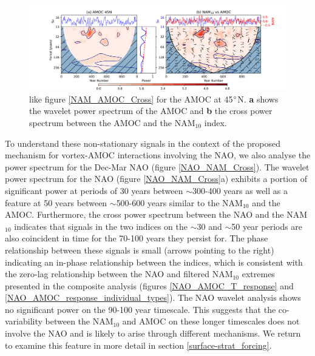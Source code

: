 \begin{center}
\begin{figure}[h!]
\noindent\includegraphics[width = \linewidth]{Figures/Figures-surface/AMOC_NAM_filtered_subplot_45N.png}
\caption[Wavelet power spectrum of the AMOC at 45$\degree$N and cross spectrum with the NAM$_{10}$ index]{like figure \ref{NAM_AMOC_Cross} for the AMOC at 45$\degree$N. \textbf{a} shows the wavelet power spectrum of the AMOC and \textbf{b} the cross power spectrum between the AMOC and the NAM$_{10}$ index.}
\label{NAM_AMOC_Cross_45}
\end{figure}
\end{center}
  
To understand these non-stationary signals in the context of the proposed mechanism for vortex-AMOC interactions involving the NAO, we also analyse the power spectrum for the Dec-Mar NAO (figure \ref{NAO_NAM_Cross}). The wavelet power spectrum for the NAO (figure \ref{NAO_NAM_Cross}a) exhibits a portion of significant power at periods of 30 years between $\sim$300-400 years as well as a feature at 50 years between $\sim$500-600 years similar to the NAM$_{10}$ and the AMOC. Furthermore, the cross power spectrum between the NAO and the NAM$_{10}$ indicates that signals in the two indices on the $\sim$30 and $\sim$50 year periods are also coincident in time for the 70-100 years they persist for. The phase relationship between these signals is small (arrows pointing to the right) indicating an in-phase relationship between the indices, which is consistent with the zero-lag relationship between the NAO and filtered NAM$_{10}$ extremes presented in the composite analysis (figures \ref{NAO_AMOC_T_response} and \ref{NAO_AMOC_response_individual_types}). The NAO wavelet analysis shows no significant power on the 90-100 year timescale. This suggests that the co-variability between the NAM$_{10}$ and AMOC on these longer timescales does not involve the NAO and is likely to arise through different mechanisms. We return to examine this feature in more detail in section \ref{surface-strat_forcing}.

